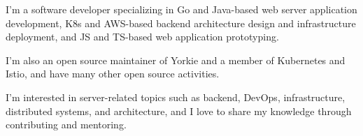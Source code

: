 

\begin{cvparagraph}

I'm a software developer specializing in Go and Java-based web server application development, K8s and AWS-based backend architecture design and infrastructure deployment, and JS and TS-based web application prototyping.

I'm also an open source maintainer of Yorkie and a member of Kubernetes and Istio, and have many other open source activities.

I'm interested in server-related topics such as backend, DevOps, infrastructure, distributed systems, and architecture, and I love to share my knowledge through contributing and mentoring.
\end{cvparagraph}
